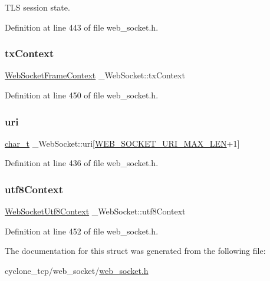 T\+LS session state. 



Definition at line 443 of file web\+\_\+socket.\+h.

\mbox{\label{struct__WebSocket_a3e4d7a24c5ad031f409427654f2cfe30}} 
\subsubsection{\texorpdfstring{tx\+Context}{txContext}}
{\footnotesize\ttfamily \hyperlink{structWebSocketFrameContext}{Web\+Socket\+Frame\+Context} \+\_\+\+Web\+Socket\+::tx\+Context}



Definition at line 450 of file web\+\_\+socket.\+h.

\mbox{\label{struct__WebSocket_aaebc5d67a16da72ef1aa214bbf512918}} 
\subsubsection{\texorpdfstring{uri}{uri}}
{\footnotesize\ttfamily \hyperlink{compiler__port_8h_a40bb5262bf908c328fbcfbe5d29d0201}{char\+\_\+t} \+\_\+\+Web\+Socket\+::uri\mbox{[}\hyperlink{web__socket_8h_ace530d4ae5bedbea825d9ac103cf2741}{W\+E\+B\+\_\+\+S\+O\+C\+K\+E\+T\+\_\+\+U\+R\+I\+\_\+\+M\+A\+X\+\_\+\+L\+EN}+1\mbox{]}}



Definition at line 436 of file web\+\_\+socket.\+h.

\mbox{\label{struct__WebSocket_ab3dc10b5359080aa6ac0cfd66f5bec45}} 
\subsubsection{\texorpdfstring{utf8\+Context}{utf8Context}}
{\footnotesize\ttfamily \hyperlink{structWebSocketUtf8Context}{Web\+Socket\+Utf8\+Context} \+\_\+\+Web\+Socket\+::utf8\+Context}



Definition at line 452 of file web\+\_\+socket.\+h.



The documentation for this struct was generated from the following file\+:\begin{DoxyCompactItemize}
\item 
cyclone\+\_\+tcp/web\+\_\+socket/\hyperlink{web__socket_8h}{web\+\_\+socket.\+h}\end{DoxyCompactItemize}
